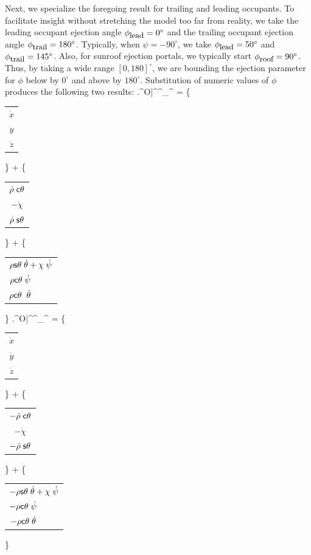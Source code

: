 \documentclass[10pt,twocolumn,reqno]{amsart}
\begin{document}
Next, we specialize the foregoing result for trailing and leading occupants.
To facilitate insight without stretching the model too far from 
reality, we take 
the leading occupant ejection angle 
$\phi_{\mbox{\small lead}} = 0^{\circ}$
and 
the trailing occupant ejection angle 
$\phi_{\mbox{\small trail}} = 180^{\circ}$.
Typically, when $\psi = -90^{\circ}$, 
we take 
$\phi_{\mbox{\small lead}} = 50^{\circ}$ and 
$\phi_{\mbox{\small trail}} = 145^{\circ}$.
Also, for sunroof ejection portals, we typically start
$\phi_{\mbox{\small roof}} = 90^{\circ}$.  
Thus, by taking a wide range $[0, 180]^{\circ}$, we are 
bounding the ejection parameter for $\phi$ 
below by $0^{\circ}$
and
above by $180^{\circ}$. 
Substitution of numeric values of $\phi$ produces the following two
results:
\be
\left.\vv^{O}\right|^{^{\circ}}_{^{\circ}} 
= 
\left\{  
	\begin{tabular}{c}
 	  	$\dot{x}$ \\ 
 		$\dot{y}$ \\ 
 		$\dot{z}$
 	\end{tabular}
\right\}
+
\left\{  
	\begin{tabular}{c}
 	  	$\dot{\rho} \; \hcos \theta$ \\ 
 		$-\dot{\chi}$ \\ 
 		$\dot{\rho} \; \hsin \theta$
 	\end{tabular}
\right\}
+
\left\{  
	\begin{tabular}{c}
 	  	$\rho \hsin \theta \; 
			\dot{\theta} + \chi \; \dot{\psi}$ \\ 
 		$\rho \hcos \theta \; 
			\dot{\psi} \;\;\;\;\;\;\;\; \;$ \\ 
 		$\rho \hcos \theta \; \; 
			\dot{\theta} \;\;\;\;\;\;\;\; \;$
 	\end{tabular}
\right\}
\ee
\be
\left.\vv^{O}\right|^{^{\circ}}_{^{\circ}} 
= 
\left\{  
	\begin{tabular}{c}
 	  	$\dot{x}$ \\ 
 		$\dot{y}$ \\ 
 		$\dot{z}$
 	\end{tabular}
\right\}
+
\left\{  
	\begin{tabular}{c}
 	  	$-\dot{\rho} \; \hcos \theta$ \\ 
 		$-\dot{\chi}$ \\ 
 		$-\dot{\rho} \; \hsin \theta$
 	\end{tabular}
\right\}
+
\left\{  
	\begin{tabular}{c}
 	  	$-\rho \hsin \theta \; 
			\dot{\theta} + \chi \; \dot{\psi}$ \\ 
 		$-\rho \hcos \theta \; 
			\dot{\psi} \;\;\;\;\;\;\;\; \;$ \\ 
 		$-\rho \hcos \theta \; 
			\dot{\theta} \;\;\;\;\;\;\;\; \;$
 	\end{tabular}
\right\}
\ee
\end{document}
